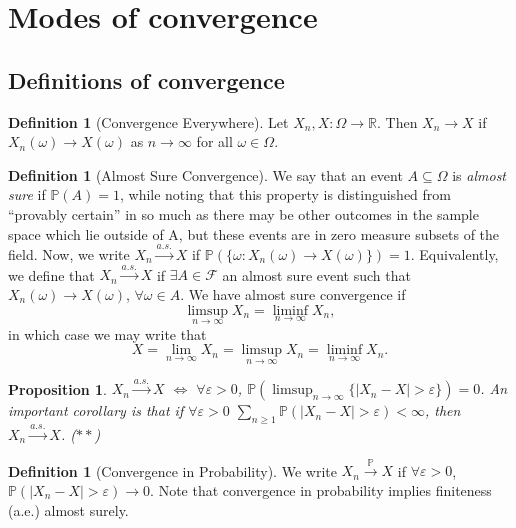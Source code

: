 \documentclass[12pt,reqno]{article}
\renewcommand{\emph}[1]{\textit{#1}}
\theoremstyle{plain}
\newtheorem{prop}[theorem]{Proposition}
\theoremstyle{definition}
\newtheorem{definition}[theorem]{Definition}
\newcommand{\PP}[1]{\ensuremath{\mathbb{P}\left(#1\right)}}
\begin{document}
\newpage 
\section{Modes of convergence} 

\subsection{Definitions of convergence} 

\begin{definition}[Convergence Everywhere]
Let $X_n,X: \Omega \rightarrow \mathbb{R}$. Then 
$X_n \rightarrow X$ if $X_n(\omega) \rightarrow X(\omega)$ as 
$n \rightarrow \infty$ for all $\omega \in \Omega$. 
\end{definition} 

\begin{definition}[Almost Sure Convergence] 
We say that an event $A \subseteq \Omega$ is \emph{almost sure} if 
$\PP{A} = 1$, while noting that this property is distinguished from 
``provably certain'' in so much as there may be other outcomes in the 
sample space which lie outside of A, but these events are in zero 
measure subsets of the field. Now, 
we write $X_n \xrightarrow{a.s.} X$ if 
$\mathbb{P}(\{\omega: X_n(\omega) \rightarrow X(\omega)\}) = 1$. 
Equivalently, we define that $X_n \xrightarrow{a.s.} X$ if 
$\exists A \in \mathcal{F}$ an almost sure event such that 
$X_n(\omega) \rightarrow X(\omega)$, $\forall \omega \in A$. 
We have almost sure convergence if
\[
\limsup_{n \rightarrow \infty} X_n = \liminf_{n \rightarrow \infty} X_n, 
\]
in which case we may write that 
\[
X = \lim_{n \rightarrow \infty} X_n = 
     \limsup_{n \rightarrow \infty} X_n = \liminf_{n \rightarrow \infty} X_n. 
\]
\end{definition}

\begin{prop}
$X_n \xrightarrow{a.s.} X$ $\iff$ $\forall \varepsilon > 0$, 
$\mathbb{P}\left(\limsup_{n \rightarrow \infty} 
     \{|X_n-X| > \varepsilon\}\right) = 0$. 
An important corollary is that if $\forall \varepsilon > 0$ 
$\sum_{n \geq 1} \PP{|X_n - X| > \varepsilon} < \infty$, then 
$X_n \xrightarrow{a.s.} X$. ($\ast\ast$)
\end{prop} 

\begin{definition}[Convergence in Probability]
We write $X_n \xrightarrow{\mathbb{P}} X$ if $\forall \varepsilon > 0$, 
$\mathbb{P}(|X_n-X| > \varepsilon) \rightarrow 0$. Note that convergence in 
probability implies finiteness (a.e.) almost surely. 
\end{definition} 
\end{document}
